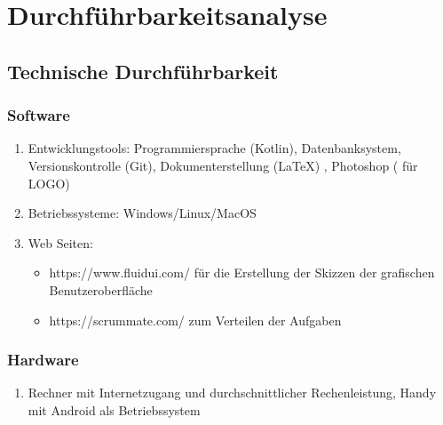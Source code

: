\documentclass[parskip=full]{scrartcl}
\begin{document}
	
	\newpage
	
	
	\section{Durchführbarkeitsanalyse}
	
	\subsection{Technische Durchführbarkeit}
	\subsubsection{Software}
	\begin{enumerate}[label={\alph*)}]
		\item Entwicklungstools: Programmiersprache (Kotlin), Datenbanksystem, Versionskontrolle (Git), Dokumenterstellung (LaTeX) , Photoshop ( für LOGO)
		
		\item Betriebssysteme: Windows/Linux/MacOS
		\item Web Seiten: 
		\begin{itemize} 
			\item https://www.fluidui.com/ für die Erstellung der Skizzen der grafischen Benutzeroberfläche 
			\item https://scrummate.com/ zum Verteilen der Aufgaben
			
		\end{itemize}
	\end{enumerate}
	
	\subsubsection{Hardware}
	\begin{enumerate}[label={\alph*)}]
		\item Rechner mit Internetzugang und durchschnittlicher Rechenleistung, Handy mit Android als Betriebssystem
	\end{enumerate}
	
\end{document}
